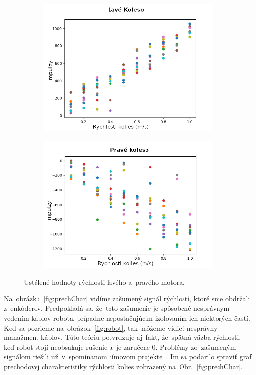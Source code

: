 \begin{figure}[!htbp]
	\begin{subfigure}{0.5\textwidth}
		\includegraphics[width=\textwidth]{img/Left_wheel_2.png}
	\end{subfigure}
	\hfill
	\begin{subfigure}{0.5\textwidth}
		\includegraphics[width=\textwidth]{img/Right_wheel_2.png}
	\end{subfigure}
	\caption{Ustálené hodnoty rýchlosti ľavého a~pravého motora. }
	\label{fig:lavePraveKoleso}
\end{figure}

Na~obrázku~\ref{fig:prechChar} vidíme zašumený signál rýchlostí, ktoré sme obdržali z~enkóderov. Predpokladá sa,
že~toto zašumenie je spôsobené nesprávnym vedením káblov robota, prípadne nepostačujúcim izolovaním ich niektorých
častí. Keď sa pozrieme na~obrázok~\ref{fig:robot}, tak~môžeme vidieť nesprávny manažment káblov. Túto teóriu
potvrdzuje aj~fakt, že~spätná väzba rýchlosti, keď robot stojí neobsahuje rušenie a~je zaručene 0. Problémy zo~zašumeným
signálom riešili už~v~spomínanom tímovom projekte~\cite{timovyProjekt}. Im sa podarilo spraviť graf prechodovej
charakteristiky rýchlosti kolies zobrazený na~Obr.~\ref{fig:prechChar}.

